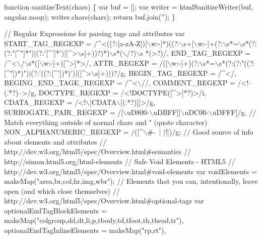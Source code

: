 \begin{DoxyCodeInclude}
\textcolor{keyword}{function} sanitizeText(chars) \{
  var buf = [];
  var writer = htmlSanitizeWriter(buf, angular.noop);
  writer.chars(chars);
  \textcolor{keywordflow}{return} buf.join(\textcolor{stringliteral}{''});
\}


\textcolor{comment}{// Regular Expressions for parsing tags and attributes}
var START\_TAG\_REGEXP =
       /^<((?:[a-zA-Z])[\(\backslash\)w:-]*)((?:\(\backslash\)s+[\(\backslash\)w:-]+(?:\(\backslash\)s*=\(\backslash\)s*(?:(?:\textcolor{stringliteral}{"[^"}]*\textcolor{stringliteral}{")|(?:'[^']*')|[^>\(\backslash\)s]+))?)*)\(\backslash\)s*(\(\backslash\)/?)\(\backslash\)s
      *(>?)/,}
\textcolor{stringliteral}{  END\_TAG\_REGEXP = /^<\(\backslash\)/\(\backslash\)s*([\(\backslash\)w:-]+)[^>]*>/,}
\textcolor{stringliteral}{  ATTR\_REGEXP = /([\(\backslash\)w:-]+)(?:\(\backslash\)s*=\(\backslash\)s*(?:(?:"}((?:[^\textcolor{stringliteral}{"])*)"})|(?:\textcolor{stringliteral}{'((?:[^'}])*)\textcolor{stringliteral}{')|([^>\(\backslash\)s]+)))?/g,}
\textcolor{stringliteral}{  BEGIN\_TAG\_REGEXP = /^</,}
\textcolor{stringliteral}{  BEGING\_END\_TAGE\_REGEXP = /^<\(\backslash\)//,}
\textcolor{stringliteral}{  COMMENT\_REGEXP = /<!--(.*?)-->/g,}
\textcolor{stringliteral}{  DOCTYPE\_REGEXP = /<!DOCTYPE([^>]*?)>/i,}
\textcolor{stringliteral}{  CDATA\_REGEXP = /<!\(\backslash\)[CDATA\(\backslash\)[(.*?)]]>/g,}
\textcolor{stringliteral}{  SURROGATE\_PAIR\_REGEXP = /[\(\backslash\)uD800-\(\backslash\)uDBFF][\(\backslash\)uDC00-\(\backslash\)uDFFF]/g,}
\textcolor{stringliteral}{  // Match everything outside of normal chars and " (quote character)}
\textcolor{stringliteral}{  NON\_ALPHANUMERIC\_REGEXP = /([^\(\backslash\)#-~| |!])/g;}
\textcolor{stringliteral}{}
\textcolor{stringliteral}{}
\textcolor{stringliteral}{// Good source of info about elements and attributes}
\textcolor{stringliteral}{// http://dev.w3.org/html5/spec/Overview.html#semantics}
\textcolor{stringliteral}{// http://simon.html5.org/html-elements}
\textcolor{stringliteral}{}
\textcolor{stringliteral}{// Safe Void Elements - HTML5}
\textcolor{stringliteral}{// http://dev.w3.org/html5/spec/Overview.html#void-elements}
\textcolor{stringliteral}{var voidElements = makeMap("area,br,col,hr,img,wbr");}
\textcolor{stringliteral}{}
\textcolor{stringliteral}{// Elements that you can, intentionally, leave open (and which close themselves)}
\textcolor{stringliteral}{// http://dev.w3.org/html5/spec/Overview.html#optional-tags}
\textcolor{stringliteral}{var optionalEndTagBlockElements = makeMap("colgroup,dd,dt,li,p,tbody,td,tfoot,th,thead,tr"),}
\textcolor{stringliteral}{    optionalEndTagInlineElements = makeMap("rp,rt"),}

\end{DoxyCodeInclude}
